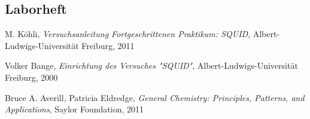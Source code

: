 \documentclass[12pt]{article}
\begin{document}

%


%

\subsection{Laborheft}
\label{Laborbuch}
\newpage
\listoffigures


\newpage
\thispagestyle{empty}
\begin{thebibliography}{9}

  

  
  

M. Köhli,
\emph{Versuchsanleitung Fortgeschrittenen Praktikum: SQUID},
Albert-Ludwigs-Universität Freiburg,
2011

Volker Bange,
\emph{Einrichtung des Versuches "SQUID"},
Albert-Ludwigs-Universität Freiburg,
2000

Bruce A. Averill, Patricia Eldredge,
\emph{General Chemistry: Principles, Patterns, and Applications},
Saylor Foundation,
2011
\end{thebibliography}
\end{document}
